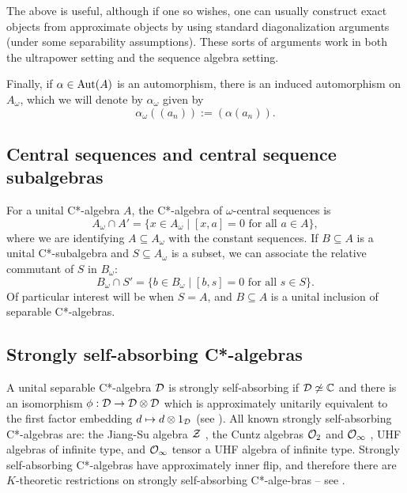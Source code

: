 \documentclass[12pt]{amsart}
\begin{document}
The above is useful, although if one so wishes, one can usually construct exact objects from approximate objects by using standard diagonalization arguments (under some separability assumptions).
These sorts of arguments work in both the ultrapower setting and the sequence algebra setting.

Finally, if $\alpha \in \operatorname{Aut}(A)$ is an automorphism, there is an induced automorphism on $A_\omega$, which we will denote by $\alpha_\omega$ given by
\begin{equation}
\alpha_\omega((a_n)) := (\alpha(a_n)). 
\end{equation}

    \subsection{Central sequences and central sequence subalgebras} For a unital C*-algebra $A$, the C*-algebra of $\omega$-central sequences is
\begin{equation}
    A_\omega \cap A' = \{x \in A_\omega \mid [x,a] = 0 \text{ for all } a \in A\},
\end{equation}
    where we are identifying $A \subseteq A_\omega$ with the constant sequences. If $B \subseteq A$ is a unital C*-subalgebra and $S \subseteq A_\omega$ is a subset, we can associate the relative commutant of $S$ in $B_\omega$:
\begin{equation}
    B_\omega \cap S' = \{b \in B_\omega \mid [b,s] = 0 \text{ for all } s \in S\}. 
\end{equation}
    Of particular interest will be when $S = A$, and $B \subseteq A$ is a unital inclusion of separable C*-algebras.

\subsection{Strongly self-absorbing C*-algebras}\label{section:ssa-C*-algebras}

A unital separable C*-algebra $\mathcal{D}$ is strongly self-absorbing if $\mathcal{D} \not\simeq \mathbb{C}$ and there is an isomorphism $\phi: \mathcal{D} \to \mathcal{D} \otimes \mathcal{D}$ which is approximately unitarily equivalent to the first factor embedding $d \mapsto d \otimes 1_{\mathcal{D}}$ (see \cite{TomsWinter07}). All known strongly self-absorbing C*-algebras are: the Jiang-Su algebra $\mathcal{Z}$ \cite{JiangSu99}, the Cuntz algebras $\mathcal{O}_2$ and $\mathcal{O}_{\infty}$ \cite{Cuntz77}, UHF algebras of infinite type, and $\mathcal{O}_{\infty}$ tensor a UHF algebra of infinite type. Strongly self-absorbing C*-algebras have approximately inner flip, and therefore there are $K$-theoretic restrictions on strongly self-absorbing C*-alge\hyp{}bras -- see \cite{Tikuisis16,EndersSchemaitatTikuisis23}.
\end{document}
